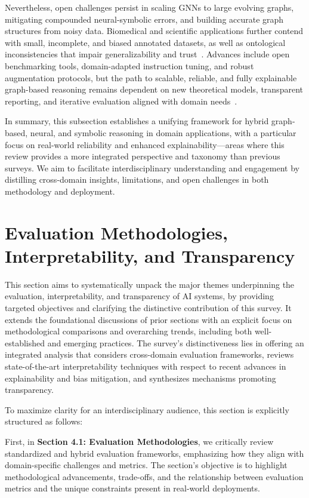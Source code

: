 \documentclass[sigconf]{acmart}
\begin{document}
Nevertheless, open challenges persist in scaling GNNs to large evolving graphs, mitigating compounded neural-symbolic errors, and building accurate graph structures from noisy data. Biomedical and scientific applications further contend with small, incomplete, and biased annotated datasets, as well as ontological inconsistencies that impair generalizability and trust~\cite{ref36,ref43,ref45,ref53,ref55,ref87,ref94}. Advances include open benchmarking tools, domain-adapted instruction tuning, and robust augmentation protocols, but the path to scalable, reliable, and fully explainable graph-based reasoning remains dependent on new theoretical models, transparent reporting, and iterative evaluation aligned with domain needs~\cite{ref2,ref3,ref18,ref19,ref36,ref47,ref48,ref49,ref50,ref55,ref61,ref62,ref80,ref87,ref88,ref89,ref94,ref95}.

In summary, this subsection establishes a unifying framework for hybrid graph-based, neural, and symbolic reasoning in domain applications, with a particular focus on real-world reliability and enhanced explainability—areas where this review provides a more integrated perspective and taxonomy than previous surveys. We aim to facilitate interdisciplinary understanding and engagement by distilling cross-domain insights, limitations, and open challenges in both methodology and deployment.

\section{Evaluation Methodologies, Interpretability, and Transparency}

This section aims to systematically unpack the major themes underpinning the evaluation, interpretability, and transparency of AI systems, by providing targeted objectives and clarifying the distinctive contribution of this survey. It extends the foundational discussions of prior sections with an explicit focus on methodological comparisons and overarching trends, including both well-established and emerging practices. The survey’s distinctiveness lies in offering an integrated analysis that considers cross-domain evaluation frameworks, reviews state-of-the-art interpretability techniques with respect to recent advances in explainability and bias mitigation, and synthesizes mechanisms promoting transparency. 

To maximize clarity for an interdisciplinary audience, this section is explicitly structured as follows: 

First, in \textbf{Section 4.1: Evaluation Methodologies}, we critically review standardized and hybrid evaluation frameworks, emphasizing how they align with domain-specific challenges and metrics. The section's objective is to highlight methodological advancements, trade-offs, and the relationship between evaluation metrics and the unique constraints present in real-world deployments.
\end{document}
